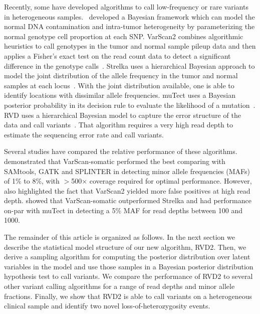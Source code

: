 \documentclass{bioinfo}
\begin{document}
Recently, some have developed algorithms to call low-frequency or rare variants in heterogeneous samples.~\citet{yau2010statistical} developed a Bayesian framework which can model the normal DNA contamination and intra-tumor heterogeneity by parameterizing the normal genotype cell proportion at each SNP. VarScan2 combines algorithmic heuristics to call genotypes in the tumor and normal sample pileup data and then applies a Fisher's exact test on the read count data to detect a significant difference in the genotype calls~\citep{Koboldt:2012cg}. Strelka uses a hierarchical Bayesian approach to model the joint distribution of the allele frequency in the tumor and normal samples at each locus~\citep{Saunders:2012fh}. With the joint distribution available, one is able to identify locations with dissimilar allele frequencies. muTect uses a Bayesian posterior probability in its decision rule to evaluate the likelihood of a mutation~\citep{Cibulskis:2013ta}. RVD uses a hierarchical Bayesian model to capture the error structure of the data and call variants~\citep{Flaherty:2011ja, cushing2013rvd}. That algorithm requires a very high read depth to estimate the sequencing error rate and call variants.


Several studies have compared the relative performance of these algorithms. \citet{spencer2013performance} demonstrated  that VarScan-somatic performed the best comparing with SAMtools, GATK and SPLINTER in detecting minor allele frequencies (MAFs) of 1\% to 8\%, with $ > $500× coverage required for optimal performance. However, \citet{spencer2013performance} also highlighted the fact that VarScan2 yielded more false positives at high read depth. \citet{Stead:2013fu} showed that VarScan-somatic outperformed Strelka and had performance on-par with muTect in detecting a 5\% MAF for read depths between 100 and 1000. %

The remainder of this article is organized as follows. In the next section we describe the statistical model structure of our new algorithm, RVD2. Then, we derive a sampling algorithm for computing the posterior distribution over latent variables in the model and use those samples in a Bayesian posterior distribution hypothesis test to call variants. We compare the performance of RVD2 to several other variant calling algorithms for a range of read depths and minor allele fractions. Finally, we show that RVD2 is able to call variants on a heterogeneous clinical sample and identify two novel loss-of-heterozygosity events.
\end{document}
